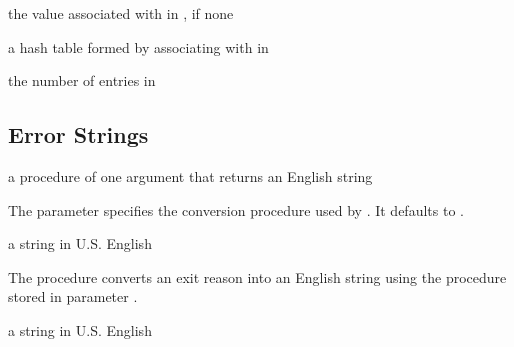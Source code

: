 \begin{procedure}
\end{procedure}
\returns{} the value associated with  in ,
 if none

\begin{procedure}
\end{procedure}
\returns{} a hash table formed by associating  with 
in 

\begin{procedure}
\end{procedure}
\returns{} the number of entries in 

\subsection{Error Strings}

\begin{parameter}
\end{parameter}
\hasvalue{} a procedure of one argument that returns an English string

The  parameter specifies the
conversion procedure used by . It defaults
to .

\begin{procedure}
\end{procedure}
\returns{} a string in U.S. English

The  procedure converts an exit reason into
an English string using the procedure stored in parameter
.

\begin{procedure}
\end{procedure}
\returns{} a string in U.S. English

